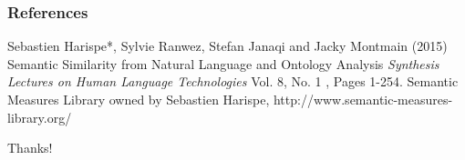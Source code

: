 \documentclass{beamer}
\begin{document}
\begin{frame}
\frametitle{References}
\footnotesize{
\begin{thebibliography}{99} %
 Sebastien Harispe*, Sylvie Ranwez, Stefan Janaqi and Jacky Montmain (2015)
\newblock Semantic Similarity from Natural Language and Ontology Analysis  
\newblock \emph{Synthesis Lectures on Human Language Technologies
} Vol. 8, No. 1 , Pages 1-254.
 Semantic Measures Library owned by Sebastien Harispe, http://www.semantic-measures-library.org/
\end{thebibliography}
}
\end{frame}


\begin{frame}
\Huge{\centerline{Thanks!}}
\end{frame}

\end{document}
